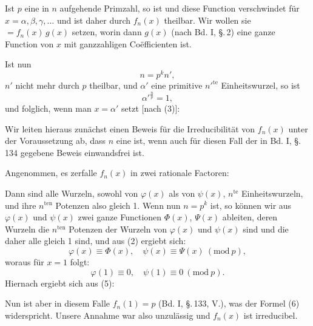
Ist $p$ eine in $n$ aufgehende Primzahl, so ist
und diese Function verschwindet für $x=\alpha, \beta, \gamma, \dots$ und ist
daher durch $f_n(x)$ theilbar. Wir wollen sie $= f_n(x)\, g(x)$ setzen,
worin dann $g(x)$ (nach Bd. I, \S.\,2) eine ganze Function von $x$
mit ganzzahligen Coëfficienten ist.

Ist nun
\[
n = p^k n',
\]
$n'$ nicht mehr durch $p$ theilbar, und $\alpha'$ eine primitive $n'^{\mathrm{te}}$ Einheitswurzel, so ist
\[
\alpha'^{\frac{n}{p}} = 1,
\]
und folglich, wenn man $x = \alpha'$ setzt [nach (3)]:

Wir leiten hieraus zunächst einen Beweis für die Irreducibilität von $f_n(x)$ unter der Voraussetzung ab, dass $n$ eine
 ist, wenn auch für diesen Fall der in Bd. I,
\S.\,134 gegebene Beweis einwandsfrei ist.

Angenommen, es zerfalle $f_n(x)$ in zwei rationale Factoren:

Dann sind alle Wurzeln, sowohl von $\varphi(x)$ als von $\psi(x)$,
$n^{\mathrm{te}}$ Einheitswurzeln, und ihre $n^{\mathrm{ten}}$ Potenzen also gleich 1. Wenn
nun $n = p^k$ ist, so können wir aus $\varphi(x)$ und $\psi(x)$ zwei ganze
Functionen $\Phi(x)$, $\Psi(x)$ ableiten, deren Wurzeln die $n^{\mathrm{ten}}$ Potenzen der Wurzeln von $\varphi(x)$ und $\psi(x)$ sind und die daher alle
gleich 1 sind, und aus (2) ergiebt sich:
\[
\varphi(x) \equiv \Phi(x), \quad \psi(x) \equiv \Psi(x) \ (\mathrm{mod}\ p),
\]
woraus für $x = 1$ folgt:
\[
\varphi(1) \equiv 0, \quad \psi(1) \equiv 0 \ (\mathrm{mod}\ p).
\]
Hiernach ergiebt sich aus (5):

Nun ist aber in diesem Falle $f_n(1) = p$ (Bd. I, \S.\,133, V.),
was der Formel (6) widerspricht. Unsere Annahme war also
unzulässig und $f_n(x)$ ist irreducibel.
